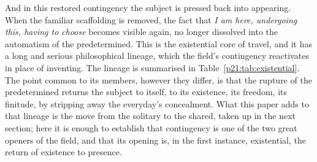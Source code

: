 And in this restored contingency the subject is pressed back into appearing. When the familiar scaffolding is removed, the fact that \emph{I am here, undergoing this, having to choose} becomes visible again, no longer dissolved into the automatism of the predetermined. This is the existential core of travel, and it has a long and serious philosophical lineage, which the field's contingency reactivates in place of inventing. The lineage is summarised in Table~\ref{p21:tab:existential}. The point common to its members, however they differ, is that the rupture of the predetermined returns the subject to itself, to its existence, its freedom, its finitude, by stripping away the everyday's concealment. What this paper adds to that lineage is the move from the solitary to the shared, taken up in the next section; here it is enough to establish that contingency is one of the two great openers of the field, and that its opening is, in the first instance, existential, the return of existence to presence.

